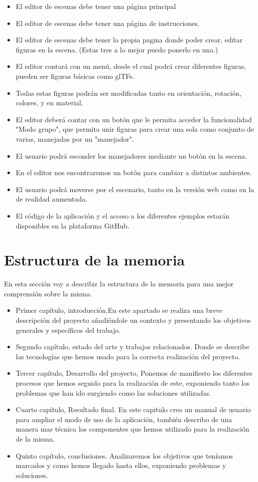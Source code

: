 \documentclass[a4paper, 12pt]{book}
\begin{document}
\begin{itemize}
  \item El editor de escenas debe tener una página principal
  \item El editor de escenas debe tener una página de instrucciones.
  \item El editor de escenas debe tener la propia pagina donde poder crear, editar figuras en la escena.
  (Estas tres a lo mejor puedo ponerlo en una.)
  \item El editor contará con un menú, desde el cual podrá crear diferentes figuras, pueden ser figuras básicas como glTFs.
  \item Todas estas figuras podrán ser modificadas tanto en orientación, rotación, colores, y en material.
  \item El editor deberá contar con un botón que le permita acceder la funcionalidad "Modo grupo", que permita unir figuras para crear una sola como conjunto de varias, manejadas por un "manejador".
  \item El usuario podrá esconder los manejadores mediante un botón en la escena.  \item En el editor nos encontraremos un botón para cambiar a distintos ambientes.
  \item El usuario podrá moverse por el escenario, tanto en la versión web como en la de realidad aumentada.
  \item El código de la aplicación y el acceso a los diferentes ejemplos estarán disponibles en la plataforma GitHub.
\end{itemize}

\section{Estructura de la memoria}
\label{sec:estructura}
En esta sección voy a describir la estructura de la memoria para una mejor 
comprensión sobre la misma.
\begin{itemize}
\item Primer capítulo, introducción.En este apartado se realiza una breve descripción del proyecto añadiéndole un contexto y presentando los objetivos generales y específicos del trabajo.
\item Segundo capítulo, estado del arte y trabajos relacionados. Donde se describe las tecnologías que hemos usado para la correcta realización del proyecto.
\item Tercer capítulo, Desarrollo del proyecto, Ponemos de manifiesto los diferentes procesos que hemos seguido para la realización de este, exponiendo tanto los problemas que han ido surgiendo como las soluciones utilizadas.
\item Cuarto capítulo, Resultado final. En este capitulo creo un manual de usuario para ampliar el modo de uso de la aplicación, también describo de una manera mas técnica los componentes que hemos utilizado para la realización de la misma.
\item Quinto capítulo, conclusiones. Analizaremos los objetivos que teníamos marcados y como hemos llegado hasta ellos, exponiendo problemas y soluciones.
\end{itemize}
\end{document}
